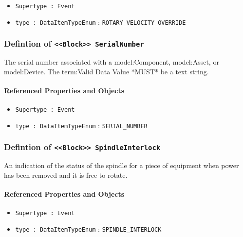 \begin{itemize}
\item \texttt{Supertype : Event}

\item \texttt{type : DataItemTypeEnum} : \texttt{ROTARY_VELOCITY_OVERRIDE}

\end{itemize}
\FloatBarrier
\subsubsection{Defintion of \texttt{<<Block>> SerialNumber}}
  \label{type:SerialNumber}

\FloatBarrier

The serial number associated with a {model:Component}, {model:Asset}, or {model:Device}. The {term:Valid Data Value} *MUST* be a text string.

\FloatBarrier
\paragraph{Referenced Properties and Objects}

\begin{itemize}
\item \texttt{Supertype : Event}

\item \texttt{type : DataItemTypeEnum} : \texttt{SERIAL_NUMBER}

\end{itemize}
\FloatBarrier
\subsubsection{Defintion of \texttt{<<Block>> SpindleInterlock}}
  \label{type:SpindleInterlock}

\FloatBarrier

An indication of the status of the spindle for a piece of equipment when power has been removed and it is free to rotate.

\FloatBarrier
\paragraph{Referenced Properties and Objects}

\begin{itemize}
\item \texttt{Supertype : Event}

\item \texttt{type : DataItemTypeEnum} : \texttt{SPINDLE_INTERLOCK}

\end{itemize}
\FloatBarrier
